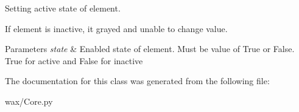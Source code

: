 Setting active state of element. 

If element is inactive, it grayed and unable to change value.


\begin{DoxyParams}{Parameters}
{\em state} & Enabled state of element. Must be value of True or False. True for active and False for inactive \\
\hline
\end{DoxyParams}


The documentation for this class was generated from the following file\+:\begin{DoxyCompactItemize}
\item 
wax/Core.\+py\end{DoxyCompactItemize}
